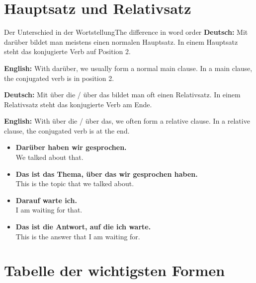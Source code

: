 \documentclass[a4paper,11pt]{article}
\newcommand{\GermanText}[1]{\textbf{Deutsch: }#1\par}
\newcommand{\EnglishText}[1]{{\small\color{SoftGray}\textbf{English: }#1\par}}
\newcommand{\ExampleItem}[2]{\item \textbf{#1}\\{\small\color{SoftGray}#2}}
\begin{document}
    
    \section{Hauptsatz und Relativsatz}
        
        \begin{grammarentry}{Der Unterschied in der Wortstellung}{The difference in word order}
            \GermanText{Mit darüber bildet man meistens einen normalen Hauptsatz. In einem Hauptsatz steht das konjugierte Verb auf Position 2.}
            \EnglishText{With darüber, we usually form a normal main clause. In a main clause, the conjugated verb is in position 2.}
            
            \GermanText{Mit über die / über das bildet man oft einen Relativsatz. In einem Relativsatz steht das konjugierte Verb am Ende.}
            \EnglishText{With über die / über das, we often form a relative clause. In a relative clause, the conjugated verb is at the end.}
            
            \begin{exbox}
                \begin{itemize}
                    \ExampleItem{Darüber haben wir gesprochen.}{We talked about that.}
                    \ExampleItem{Das ist das Thema, über das wir gesprochen haben.}{This is the topic that we talked about.}
                    \ExampleItem{Darauf warte ich.}{I am waiting for that.}
                    \ExampleItem{Das ist die Antwort, auf die ich warte.}{This is the answer that I am waiting for.}
                \end{itemize}
            \end{exbox}
        \end{grammarentry}
    
    
    \section{Tabelle der wichtigsten Formen}
        
\end{document}
